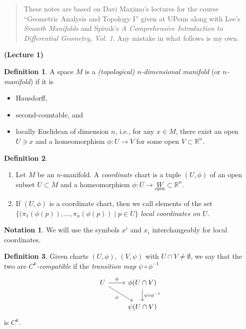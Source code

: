 \documentclass[10pt,letterpaper,cm]{nupset}
\theoremstyle{definition}
\newtheorem*{definition}{Definition}
\newtheorem*{notation}{Notation}
\newcommand{\R}{\mathbb R}
\newcommand{\1}{\mathbf{1}}
\newcommand{\0}{\vec 0}
\begin{document}
\begin{abstract}
These notes are based on Davi Maximo's lectures for the course ``Geometric Analysis and Topology I'' given at UPenn along with Lee's \textit{Smooth Manifolds} and Spivak's \textit{A Comprehensive Introduction to Differential Geometry, Vol. 1}. Any mistake in what follows is my own.
\end{abstract}

\begin{center}
{\textbf{(Lecture 1)}} 
\end{center}

\theoremstyle{definition}
\begin{definition}{A space $M$ is a \textit{(topological) $n$-dimensional manifold} (or \textit{$n$-manifold}) if it is 
\begin{itemize}
\item Hausdorff, 
\item second-countable, and 
\item locally Euclidean of dimension $n$, i.e., for any $x\in M$, there exist an open $U\ni x$ and a homeomorphism $\phi : U \to V$ for some open $V\subset \R^n$.
\end{itemize}
}
\end{definition}

\begin{definition} $ $
\begin{enumerate}
\item Let $M$ be an $n$-manifold. A \textit{coordinate} chart is a tuple $(U, \phi)$ of an open subset $U\subset M$ and a homeomorphism $\phi: U \to \underset{\text{open}} W \subset \R^n$.
\item If $(U, \phi)$ is a coordinate chart, then we call elements of the set $\{(\pi_1(\phi(p)), \ldots, \pi_n(\phi(p)) \mid p \in U\}$ \textit{local coordinates on $U$}.
\end{enumerate}
\end{definition}

\begin{notation}
We will use the symbols $x^i$ and $x_i$ interchangeably for local coordinates. 
\end{notation}


\theoremstyle{definition}
\begin{definition}Given charts $(U, \phi)$, $(V, \psi)$ with $U \cap V \ne \emptyset$, we say that the two are \textit{$C^k$-compatible} if the \textit{transition map $\psi \circ \phi^{-1}$}
 \[
  \begin{tikzcd}
    U \arrow{r}{\phi} \arrow[swap]{dr}{\psi} & \phi(U\cap V) \arrow{d}{\psi \circ \phi^{-1}} \\
     & \psi(U \cap V)
  \end{tikzcd}
\]
is $C^k$.
\end{definition}
\end{document}
